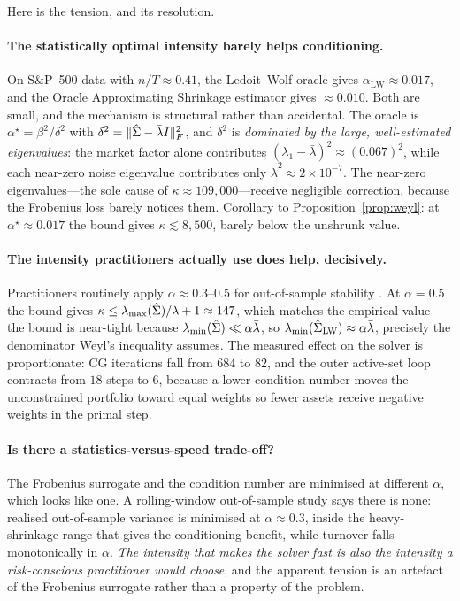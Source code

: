 Here is the tension, and its resolution.

\paragraph{The statistically optimal intensity barely helps conditioning.} On S\&P~500
data with $n/T \approx 0.41$, the Ledoit--Wolf oracle gives
$\alpha_{\mathrm{LW}} \approx 0.017$, and the Oracle Approximating Shrinkage
estimator \cite{chen2010} gives $\approx 0.010$. Both are small, and the mechanism is
structural rather than accidental. The oracle is $\alpha^\star = \beta^2/\delta^2$ with
$\delta^2 = \lVert \hat{\Sigma} - \bar\lambda I \rVert_F^2$, and $\delta^2$ is \emph{dominated by
the large, well-estimated eigenvalues}: the market factor alone contributes
$(\lambda_1 - \bar\lambda)^2 \approx (0.067)^2$, while each near-zero noise eigenvalue
contributes only $\bar\lambda^2 \approx 2\times10^{-7}$. The near-zero eigenvalues---the
sole cause of $\kappa \approx 109{,}000$---receive negligible correction, because the
Frobenius loss barely notices them. Corollary to Proposition~\ref{prop:weyl}: at
$\alpha^\star \approx 0.017$ the bound gives $\kappa \lesssim 8{,}500$, barely below
the unshrunk value.

\paragraph{The intensity practitioners actually use does help, decisively.}
Practitioners routinely apply $\alpha \approx 0.3$--$0.5$ for out-of-sample stability
\cite{demiguel2009,ledoit2003jpm}. At $\alpha = 0.5$ the bound gives
$\kappa \le \lambda_{\max}(\hat{\Sigma})/\bar\lambda + 1 \approx 147$, which matches the
empirical value---the bound is near-tight because
$\lambda_{\min}(\hat{\Sigma}) \ll \alpha\bar\lambda$, so
$\lambda_{\min}(\hat{\Sigma}_{\mathrm{LW}}) \approx \alpha\bar\lambda$, precisely the
denominator Weyl's inequality assumes. The measured effect on the solver is
proportionate: CG iterations fall from $684$ to $82$, and the outer active-set loop
contracts from $18$ steps to $6$, because a lower condition number moves the
unconstrained portfolio toward equal weights so fewer assets receive negative weights
in the primal step.

\paragraph{Is there a statistics-versus-speed trade-off?} The Frobenius surrogate and
the condition number are minimised at different $\alpha$, which looks like one. A
rolling-window out-of-sample study says there is none: realised out-of-sample variance
is minimised at $\alpha \approx 0.3$, inside the heavy-shrinkage range that gives the
conditioning benefit, while turnover falls monotonically in $\alpha$. \emph{The
intensity that makes the solver fast is also the intensity a risk-conscious
practitioner would choose}, and the apparent tension is an artefact of the Frobenius
surrogate rather than a property of the problem.


